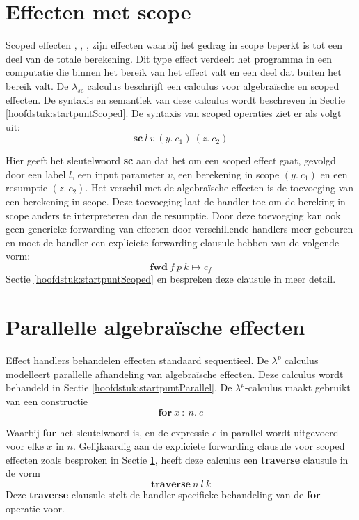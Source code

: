 \section{Effecten met scope} \label{hoofdstuk:AchteffScope}
Scoped effecten \cite{Bosman2022}, \cite{Wu2014}, \cite{Yang2022}, \cite{Pirog2018} zijn effecten waarbij het gedrag in scope beperkt is tot een deel van de totale berekening. Dit type effect verdeelt het programma in een computatie die binnen het bereik van het effect valt en een deel dat buiten het bereik valt. De $\lambda_{sc}$ calculus \cite{Bosman2022} beschrijft een calculus voor algebraïsche en scoped effecten. De syntaxis en semantiek van deze calculus wordt beschreven in Sectie \ref{hoofdstuk:startpuntScoped}. De syntaxis van scoped operaties ziet er als volgt uit:
\begin{equation}
    \textbf{sc}\:l\:v\:(y.\:c_{1})\:(z.\:c_{2})
\end{equation}

Hier geeft het sleutelwoord \textbf{sc} aan dat het om een scoped effect gaat, gevolgd door een label $l$, een input parameter $v$, een berekening in scope $(y.\:c_{1})$ en een resumptie $(z.\:c_{2})$. Het verschil met de algebraïsche effecten is de toevoeging van een berekening in scope. Deze toevoeging laat de handler toe om de bereking in scope anders te interpreteren dan de resumptie. Door deze toevoeging kan ook geen generieke forwarding van effecten door verschillende handlers meer gebeuren en moet de handler een expliciete forwarding clausule hebben van de volgende vorm:
\begin{equation}
    \textbf{fwd}\:f\:p\:k \mapsto c_{f}
\end{equation}
Sectie \ref{hoofdstuk:startpuntScoped} en \cite{Bosman2022} bespreken deze clausule in meer detail.


\section{Parallelle algebraïsche effecten}
\label{hoofdstuk:AchteffPar}
Effect handlers behandelen effecten standaard sequentieel. De $\lambda^{p}$ calculus \cite{Xie2021} modelleert parallelle afhandeling van algebraïsche effecten. Deze calculus wordt behandeld in Sectie \ref{hoofdstuk:startpuntParallel}. De $\lambda^{p}$-calculus maakt gebruikt van een constructie 
\begin{equation}
    \textbf{for}\:x\::\:n.\:e
\end{equation}

Waarbij \textbf{for} het sleutelwoord is, en de expressie $e$ in parallel wordt uitgevoerd voor elke $x$ in $n$. Gelijkaardig aan de expliciete forwarding clausule voor scoped effecten zoals besproken in Sectie \ref{hoofdstuk:AchteffScope}, heeft deze calculus een \textbf{traverse} clausule in de vorm
\begin{equation}
    \textbf{traverse}\:n\:l\:k
\end{equation}
Deze \textbf{traverse} clausule stelt de handler-specifieke behandeling van de \textbf{for} operatie voor.

